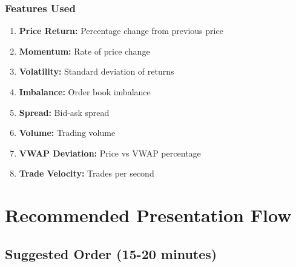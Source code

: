 \documentclass[12pt,a4paper]{article}
\begin{document}
\subsubsection{Features Used}
\begin{enumerate}
    \item \textbf{Price Return:} Percentage change from previous price
    \item \textbf{Momentum:} Rate of price change
    \item \textbf{Volatility:} Standard deviation of returns
    \item \textbf{Imbalance:} Order book imbalance
    \item \textbf{Spread:} Bid-ask spread
    \item \textbf{Volume:} Trading volume
    \item \textbf{VWAP Deviation:} Price vs VWAP percentage
    \item \textbf{Trade Velocity:} Trades per second
\end{enumerate}

\section{Recommended Presentation Flow}

\subsection{Suggested Order (15-20 minutes)}
\end{document}
